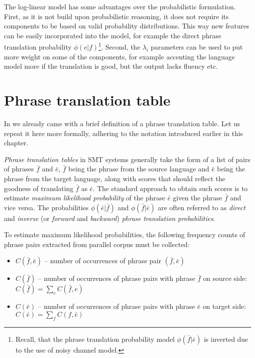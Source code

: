 The log-linear model has some advantages over the probabilistic formulation.
First, as it is not build upon probabilistic reasoning, it does not require its
components to be based on valid probability distributions.
This way new features can be easily incorporated into the model, for example the direct
phrase translation probability $\phi(e|f)$\footnote{Recall, that the phrase translation
probability model $\phi(\bar{f}|\bar{e})$ is inverted due to the use of noisy channel model.}.
Second, the $\lambda_i$ parameters can be used to put more weight on some of the components,
for example accenting the language model more if the translation is good, but the output
lacks fluency etc.

\section{Phrase translation table}


In  we already came with a brief definition of a phrase
translation table. Let us repeat it here more formally, adhering
to the notation introduced earlier in this chapter.

\emph{Phrase translation tables} in SMT systems generally take the form of a list of
pairs of phrases $\bar{f}$ and $\bar{e}$, $\bar{f}$ being the phrase from the source
language and $\bar{e}$ being the phrase from the target language, along with scores
that should reflect the goodness of translating $\bar{f}$ as $\bar{e}$.
The standard approach to obtain such scores is to estimate \emph{maximum likelihood
probability} of the phrase $\bar{e}$ given the phrase $\bar{f}$ and vice versa.
The probabilities $\phi(\bar{e}|\bar{f})$ and $\phi(\bar{f}|\bar{e})$ are often
referred to as \emph{direct} and \emph{inverse} (or \emph{forward} and \emph{backward})
\emph{phrase translation probabilities}.

To estimate maximum likelihood probabilities, the following frequency counts
of phrase pairs extracted from parallel corpus must be collected:
\begin{itemize}
  \item $C(\bar{f},\bar{e})$ -- number of occurrences of phrase pair $(\bar{f},\bar{e})$
  \item $C(\bar{f})$ -- number of occurrences of phrase pairs with phrase $\bar{f}$ on source side:
    $C(\bar{f}) = \sum_{e}{C(\bar{f},e)}$
  \item $C(\bar{e})$ -- number of occurrences of phrase pairs with phrase $\bar{e}$ on target side:
    $C(\bar{e}) = \sum_{f}{C(f,\bar{e})}$
\end{itemize}

